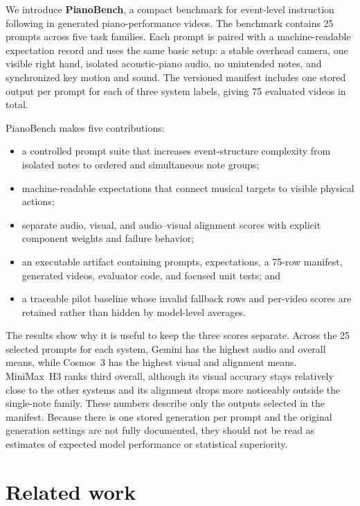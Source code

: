 \documentclass{article}
\begin{document}
We introduce \textbf{PianoBench}, a compact benchmark for event-level instruction following in generated piano-performance videos. The benchmark contains 25 prompts across five task families. Each prompt is paired with a machine-readable expectation record and uses the same basic setup: a stable overhead camera, one visible right hand, isolated acoustic-piano audio, no unintended notes, and synchronized key motion and sound. The versioned manifest includes one stored output per prompt for each of three system labels, giving 75 evaluated videos in total.

PianoBench makes five contributions:
\begin{itemize}
  \item a controlled prompt suite that increases event-structure complexity from isolated notes to ordered and simultaneous note groups;
  \item machine-readable expectations that connect musical targets to visible physical actions;
  \item separate audio, visual, and audio--visual alignment scores with explicit component weights and failure behavior;
  \item an executable artifact containing prompts, expectations, a 75-row manifest, generated videos, evaluator code, and focused unit tests; and
  \item a traceable pilot baseline whose invalid fallback rows and per-video scores are retained rather than hidden by model-level averages.
\end{itemize}

The results show why it is useful to keep the three scores separate. Across the 25 selected prompts for each system, Gemini has the highest audio and overall means, while Cosmos~3 has the highest visual and alignment means. MiniMax~H3 ranks third overall, although its visual accuracy stays relatively close to the other systems and its alignment drops more noticeably outside the single-note family. These numbers describe only the outputs selected in the manifest. Because there is one stored generation per prompt and the original generation settings are not fully documented, they should not be read as estimates of expected model performance or statistical superiority.

\section{Related work}
\label{sec:related-work}
\end{document}

